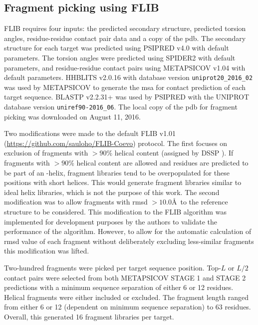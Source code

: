 \subsection{Fragment picking using FLIB}
FLIB \cite{De_Oliveira2015-ba} requires four inputs: the predicted secondary structure, predicted torsion angles, residue-residue contact pair data and a copy of the \gls{pdb}. The secondary structure for each target was predicted using PSIPRED v4.0 \cite{Jones1999-fi} with default parameters. The torsion angles were predicted using SPIDER2 \cite{Heffernan2015-wp} with default parameters, and residue-residue contact pairs using METAPSICOV v1.04 \cite{Jones2015-wp} with default parameters. HHBLITS v2.0.16 \cite{Remmert2011-ze} with database version \texttt{uniprot20\_2016\_02} was used by METAPSICOV to generate the \gls{msa} for contact prediction of each target sequence. BLASTP v2.2.31+ \cite{Altschul1990-nc,Camacho2009-ue} was used by PSIPRED with the UNIPROT database version \texttt{uniref90-2016\_06}. The local copy of the \gls{pdb} for fragment picking was downloaded on August 11, 2016.

Two modifications were made to the default FLIB v1.01 (\url{https://github.com/sauloho/FLIB-Coevo}) protocol. The first focuses on exclusion of fragments with $>90$\% helical content (assigned by DSSP \cite{Frishman1995-ns}). If fragments with $>90$\% helical content are allowed and residues are predicted to be part of an \textalpha-helix, fragment libraries tend to be overpopulated for these positions with short helices. This would generate fragment libraries similar to ideal helix libraries, which is not the purpose of this work. The second modification was to allow fragments with \gls{rmsd} $>10.0$\AA\ to the reference structure to be considered. This modification to the FLIB algorithm was implemented for development purposes by the authors to validate the performance of the algorithm. However, to allow for the automatic calculation of \gls{rmsd} value of each fragment without deliberately excluding less-similar fragments this modification was lifted.

Two-hundred fragments were picked per target sequence position. Top-$L$ or $L/2$ contact pairs were selected from both METAPSICOV STAGE 1 and STAGE 2 predictions with a minimum sequence separation of either 6 or 12 residues. Helical fragments were either included or excluded. The fragment length ranged from either 6 or 12 (dependent on minimum sequence separation) to 63 residues. Overall, this generated 16 fragment libraries per target.

